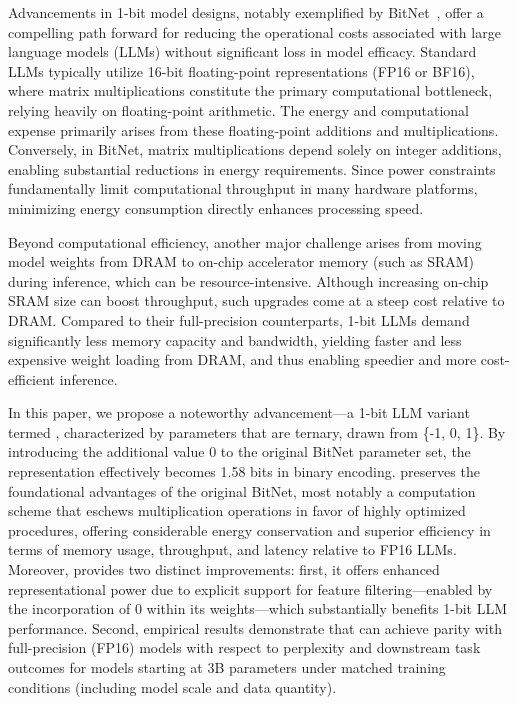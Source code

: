 Advancements in 1-bit model designs, notably exemplified by BitNet~\cite{bitnet}, offer a compelling path forward for reducing the operational costs associated with large language models (LLMs) without significant loss in model efficacy. Standard LLMs typically utilize 16-bit floating-point representations (FP16 or BF16), where matrix multiplications constitute the primary computational bottleneck, relying heavily on floating-point arithmetic. The energy and computational expense primarily arises from these floating-point additions and multiplications. Conversely, in BitNet, matrix multiplications depend solely on integer additions, enabling substantial reductions in energy requirements. Since power constraints fundamentally limit computational throughput in many hardware platforms, minimizing energy consumption directly enhances processing speed.

Beyond computational efficiency, another major challenge arises from moving model weights from DRAM to on-chip accelerator memory (such as SRAM) during inference, which can be resource-intensive. Although increasing on-chip SRAM size can boost throughput, such upgrades come at a steep cost relative to DRAM. Compared to their full-precision counterparts, 1-bit LLMs demand significantly less memory capacity and bandwidth, yielding faster and less expensive weight loading from DRAM, and thus enabling speedier and more cost-efficient inference.

In this paper, we propose a noteworthy advancement—a 1-bit LLM variant termed \textbf{}, characterized by parameters that are ternary, drawn from \{-1, 0, 1\}. By introducing the additional value 0 to the original BitNet parameter set, the representation effectively becomes 1.58 bits in binary encoding.  preserves the foundational advantages of the original BitNet, most notably a computation scheme that eschews multiplication operations in favor of highly optimized procedures, offering considerable energy conservation and superior efficiency in terms of memory usage, throughput, and latency relative to FP16 LLMs. Moreover,  provides two distinct improvements: first, it offers enhanced representational power due to explicit support for feature filtering—enabled by the incorporation of 0 within its weights—which substantially benefits 1-bit LLM performance. Second, empirical results demonstrate that  can achieve parity with full-precision (FP16) models with respect to perplexity and downstream task outcomes for models starting at 3B parameters under matched training conditions (including model scale and data quantity).

